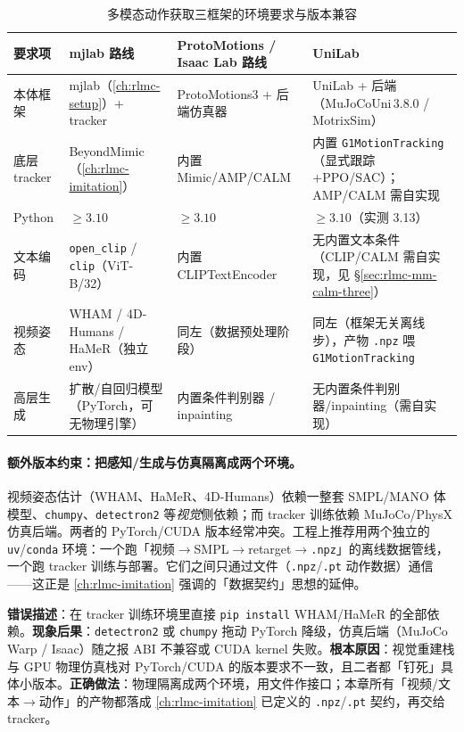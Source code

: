 \begin{table}[ht]
\centering
\small
\caption{多模态动作获取三框架的环境要求与版本兼容}
\label{tab:rlmc-mm-req}
\begin{tabular}{@{}llll@{}}
\toprule
要求项 & mjlab 路线 & ProtoMotions / Isaac Lab 路线 & UniLab \\
\midrule
本体框架 & mjlab（\cref{ch:rlmc-setup}）+ tracker & ProtoMotions3 + 后端仿真器 & UniLab + 后端（MuJoCoUni\,3.8.0 / MotrixSim） \\
底层 tracker & BeyondMimic（\cref{ch:rlmc-imitation}） & 内置 Mimic/AMP/CALM & 内置 \texttt{G1MotionTracking}（显式跟踪+PPO/SAC）；AMP/CALM 需自实现 \\
Python & $\ge 3.10$ & $\ge 3.10$ & $\ge 3.10$（实测 3.13） \\
文本编码 & \texttt{open\_clip} / \texttt{clip}（ViT-B/32） & 内置 CLIPTextEncoder & 无内置文本条件（CLIP/CALM 需自实现，见 \S\ref*{sec:rlmc-mm-calm-three}） \\
视频姿态 & WHAM / 4D-Humans / HaMeR（独立 env） & 同左（数据预处理阶段） & 同左（框架无关离线步），产物 \texttt{.npz} 喂 \texttt{G1MotionTracking} \\
高层生成 & 扩散/自回归模型（PyTorch，可无物理引擎） & 内置条件判别器 / inpainting & 无内置条件判别器/inpainting（需自实现） \\
\bottomrule
\end{tabular}
\end{table}

\paragraph{额外版本约束：把感知/生成与仿真隔离成两个环境。}视频姿态估计（WHAM、HaMeR、4D-Humans）依赖一整套 SMPL/MANO 体模型、\verb|chumpy|、\verb|detectron2| 等\emph{视觉}侧依赖；而 tracker 训练依赖 MuJoCo/PhysX 仿真后端。两者的 PyTorch/CUDA 版本经常冲突。工程上推荐用两个独立的 \verb|uv|/\verb|conda| 环境：一个跑「视频$\to$SMPL$\to$retarget$\to$\texttt{.npz}」的离线数据管线，一个跑 tracker 训练与部署。它们之间只通过文件（\texttt{.npz}/\texttt{.pt} 动作数据）通信——这正是 \cref{ch:rlmc-imitation} 强调的「数据契约」思想的延伸。

\begin{pitfall}[把「生成」与「跟踪」混在一个环境里]
\textbf{错误描述}：在 tracker 训练环境里直接 \verb|pip install| WHAM/HaMeR 的全部依赖。\textbf{现象后果}：\verb|detectron2| 或 \verb|chumpy| 拖动 PyTorch 降级，仿真后端（MuJoCo Warp / Isaac）随之报 ABI 不兼容或 CUDA kernel 失败。\textbf{根本原因}：视觉重建栈与 GPU 物理仿真栈对 PyTorch/CUDA 的版本要求不一致，且二者都「钉死」具体小版本。\textbf{正确做法}：物理隔离成两个环境，用文件作接口；本章所有「视频/文本$\to$动作」的产物都落成 \cref{ch:rlmc-imitation} 已定义的 \texttt{.npz}/\texttt{.pt} 契约，再交给 tracker。
\end{pitfall}

